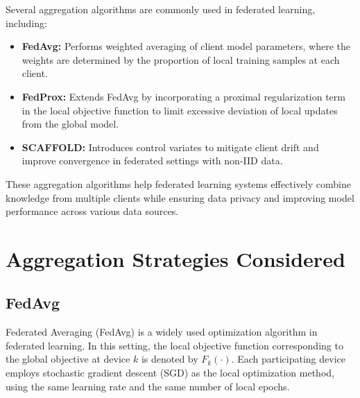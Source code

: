 \documentclass[12pt]{book}
\begin{document}
Several aggregation algorithms are commonly used in federated learning, including:

\begin{itemize}
    \item \textbf{FedAvg:} Performs weighted averaging of client model parameters, where the weights are determined by the proportion of local training samples at each client.

    \item \textbf{FedProx:} Extends FedAvg by incorporating a proximal regularization term in the local objective function to limit excessive deviation of local updates from the global model.

    \item \textbf{SCAFFOLD:} Introduces control variates to mitigate client drift and improve convergence in federated settings with non-IID data.
\end{itemize}


These aggregation algorithms help federated learning systems effectively combine knowledge from multiple clients while ensuring data privacy and improving model performance across various data sources.


\vspace{7cm}

\chapter{Aggregation Strategies Considered}

\section{FedAvg}

Federated Averaging (FedAvg) is a widely used optimization algorithm in federated learning. In this setting, the local objective function corresponding to the global objective at device $k$ is denoted by $F_k(\cdot)$. Each participating device employs stochastic gradient descent (SGD) as the local optimization method, using the same learning rate and the same number of local epochs.
\end{document}

